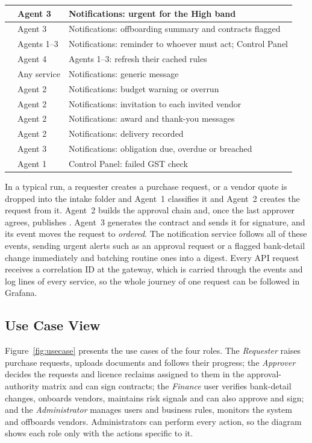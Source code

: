 \begin{longtable}{|L{0.36\textwidth}|L{0.13\textwidth}|L{0.41\textwidth}|}
 & Agent 3 & Notifications: urgent for the High band \\ \hline
{} & Agent 3 & Notifications: offboarding summary and contracts flagged \\ \hline
{} & Agents 1--3 & Notifications: reminder to whoever must act; Control Panel \\ \hline
{} & Agent 4 & Agents 1--3: refresh their cached rules \\ \hline
{} & Any service & Notifications: generic message \\ \hline
{} & Agent 2 & Notifications: budget warning or overrun \\ \hline
{} & Agent 2 & Notifications: invitation to each invited vendor \\ \hline
{} & Agent 2 & Notifications: award and thank-you messages \\ \hline
{} & Agent 2 & Notifications: delivery recorded \\ \hline
{} & Agent 3 & Notifications: obligation due, overdue or breached \\ \hline
{} & Agent 1 & Control Panel: failed GST check \\ \hline
\end{longtable}

In a typical run, a requester creates a purchase request, or a vendor quote is dropped into the intake folder and Agent~1 classifies it and Agent~2 creates the request from it. Agent~2 builds the approval chain and, once the last approver agrees, publishes . Agent~3 generates the contract and sends it for signature, and its  event moves the request to \emph{ordered}. The notification service follows all of these events, sending urgent alerts such as an approval request or a flagged bank-detail change immediately and batching routine ones into a digest. Every API request receives a correlation ID at the gateway, which is carried through the events and log lines of every service, so the whole journey of one request can be followed in Grafana.

\subsection{Use Case View}
Figure~\ref{fig:usecase} presents the use cases of the four roles. The \emph{Requester} raises purchase requests, uploads documents and follows their progress; the \emph{Approver} decides the requests and licence reclaims assigned to them in the approval-authority matrix and can sign contracts; the \emph{Finance} user verifies bank-detail changes, onboards vendors, maintains risk signals and can also approve and sign; and the \emph{Administrator} manages users and business rules, monitors the system and offboards vendors. Administrators can perform every action, so the diagram shows each role only with the actions specific to it.

